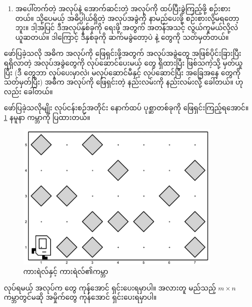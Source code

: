 \begin{sloppypar}
\begin{enumerate}
  \item အပေါ်တက်တဲ့ အလုပ်နဲ့ အောက်ဆင်းတဲ့ အလုပ်ကို ထပ်ပြီးခွဲကြည့်ဖို့ စဉ်းစားတယ်။ သို့ပေမယ့် အဓိပ္ပါယ်ရှိတဲ့ အလုပ်အခွဲကို နာမည်ပေးဖို့ စဉ်းစားလို့မရတော့ဘူး။ ဒါ့အပြင် ဒီအလုပ်နှစ်ခုကို \mmprogram ရေးဖို့ အတွက် အတန်အသင့် လွယ်ကူမယ်လို့လဲ ယူဆတယ်။ ဒါကြောင့် ဒီနှစ်ခုကို ဆက်မခွဲတော့ပဲ နဲ့  တွေကို သတ်မှတ်တယ်။ 
  \label{itm:HurdleJumpingJumpSubsub}
\end{enumerate}

ဖော်ပြခဲ့သလို အဓိက အလုပ်ကို ဖြေရှင်းဖို့အတွက် အလုပ်အခွဲတွေ အဖြစ်ပိုင်းခြားပြီး ရရှိလာတဲ့ အလုပ်အခွဲတွေကို လုပ်ဆောင်ပေးမယ့် \mmcommand တွေ ရှိထားပြီး ဖြစ်သကဲ့သို့ မှတ်ယူပြီး (ဒီ \mmcommand တွေဘာ လုပ်ပေးမှာလဲ၊ မလုပ်ဆောင်မီနှင့် လုပ်ဆောင်ပြီး အခြေအနေ တွေကို သတ်မှတ်ပြီး) အဓိက အလုပ်ကို ဖြေရှင်းတဲ့ နည်းလမ်းကို \mmTopDown နည်းလမ်းလို့ ခေါ်တယ်။  \enStepWiseRefinement ဟုလည်း ခေါ်တယ်။ 

ဖော်ပြခဲ့သလိုမျိုး လုပ်ငန်းစဉ်အတိုင်း နောက်ထပ် ပုစ္ဆာတစ်ခုကို ဖြေရှင်းကြည့်ရအောင်။ \Fig \ref{fig:SweepTheStreetsW1} နမူနာ ကမ္ဘာကို ပြထားတယ်။ 
\begin{figure}[!htb]
  \caption{ကားရဲလ်နှင့်  ကားရဲလ်၏ကမ္ဘာ}\label{fig:SweepTheStreetsW1}
  \includegraphics[width=4in, left]{ch03/SweepTheStreets/init_w1.jpg}
\end{figure}
လုပ်ရမယ့် အလုပ်က \mmbeeper တွေ ကုန်အောင် ရှင်းပေးရမှာပါ။ အလားတူ မည်သည့် $m \times n$ ကမ္ဘာတွင်မဆို အမှိုက်တွေ ကုန်အောင် ရှင်းပေးရမှာပါ။


\end{sloppypar}
